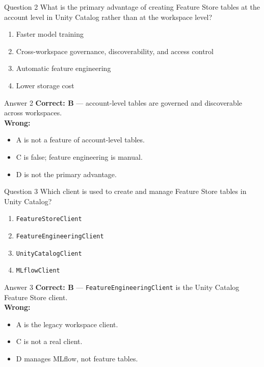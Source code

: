 \documentclass[aspectratio=169,11pt]{beamer}
\begin{document}
	\begin{frame}{Question 2}
		What is the primary advantage of creating Feature Store tables at the account level in Unity Catalog rather than at the workspace level?
		\begin{enumerate}[label=\Alph*.]
			\item Faster model training
			\item Cross-workspace governance, discoverability, and access control
			\item Automatic feature engineering
			\item Lower storage cost
		\end{enumerate}
	\end{frame}
	\begin{frame}{Answer 2}
		\textbf{Correct: B} --- account-level tables are governed and discoverable across workspaces.\\
		\vspace{0.5em}
		\textbf{Wrong:}
		\begin{itemize}
			\item A is not a feature of account-level tables.
			\item C is false; feature engineering is manual.
			\item D is not the primary advantage.
		\end{itemize}
	\end{frame}
	
	\begin{frame}{Question 3}
		Which client is used to create and manage Feature Store tables in Unity Catalog?
		\begin{enumerate}[label=\Alph*.]
			\item \texttt{FeatureStoreClient}
			\item \texttt{FeatureEngineeringClient}
			\item \texttt{UnityCatalogClient}
			\item \texttt{MLflowClient}
		\end{enumerate}
	\end{frame}
	\begin{frame}{Answer 3}
		\textbf{Correct: B} --- \texttt{FeatureEngineeringClient} is the Unity Catalog Feature Store client.\\
		\vspace{0.5em}
		\textbf{Wrong:}
		\begin{itemize}
			\item A is the legacy workspace client.
			\item C is not a real client.
			\item D manages MLflow, not feature tables.
		\end{itemize}
	\end{frame}
	
\end{document}
